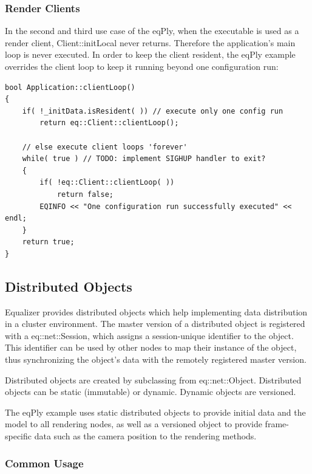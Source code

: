 \documentclass[10pt,a4]{scrartcl}
\begin{document}
\subsubsection{Render Clients}

In the second and third use case of the \textsf{eqPly}, when the
executable is used as a render client, \textsf{Client::initLocal} never
returns. Therefore the application's main loop is never executed. In
order to keep the client resident, the \textsf{eqPly} example overrides
the client loop to keep it running beyond one configuration run:

{\footnotesize\begin{lstlisting}
bool Application::clientLoop()
{
    if( !_initData.isResident( )) // execute only one config run
        return eq::Client::clientLoop();

    // else execute client loops 'forever'
    while( true ) // TODO: implement SIGHUP handler to exit?
    {
        if( !eq::Client::clientLoop( ))
            return false;
        EQINFO << "One configuration run successfully executed" << endl;
    }
    return true;
}
\end{lstlisting}}%


\subsection{\label{sNetObject}Distributed Objects}

Equalizer provides distributed objects which help implementing data
distribution in a cluster environment. The master version of a
distributed object is registered with a \textsf{eq::net::Session}, which
assigns a session-unique identifier to the object. This identifier can
be used by other nodes to map their instance of the object, thus
synchronizing the object's data with the remotely registered master
version.

Distributed objects are created by subclassing from
\textsf{eq::net::Object}. Distributed objects can be static (immutable) or
dynamic. Dynamic objects are versioned.

The \textsf{eqPly} example uses static distributed objects to provide
initial data and the model to all rendering nodes, as well as a
versioned object to provide frame-specific data such as the camera
position to the rendering methods.

\subsubsection{Common Usage}
\end{document}
